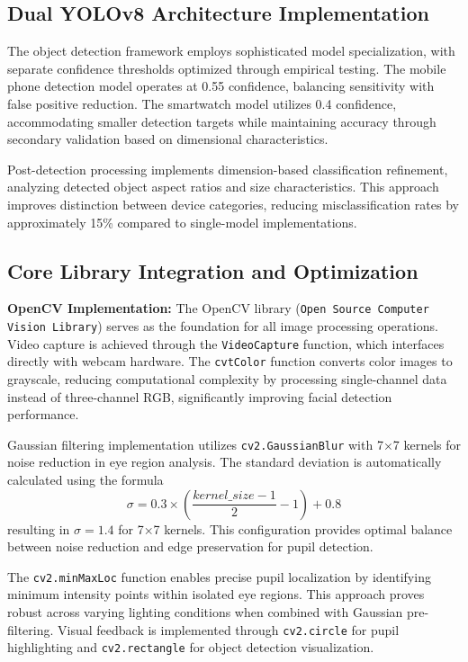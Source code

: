 \documentclass[conference]{IEEEtran}
\begin{document}
\subsection{Dual YOLOv8 Architecture Implementation}

The object detection framework employs sophisticated model specialization, with separate confidence thresholds optimized through empirical testing\cite{ultralytics}. The mobile phone detection model operates at 0.55 confidence, balancing sensitivity with false positive reduction. The smartwatch model utilizes 0.4 confidence, accommodating smaller detection targets while maintaining accuracy through secondary validation based on dimensional characteristics.

Post-detection processing implements dimension-based classification refinement, analyzing detected object aspect ratios and size characteristics. This approach improves distinction between device categories, reducing misclassification rates by approximately 15\% compared to single-model implementations\cite{redmon2018yolov3}.

\subsection{Core Library Integration and Optimization}

\textbf{OpenCV Implementation:} The OpenCV library (\texttt{Open Source Computer Vision Library}) serves as the foundation for all image processing operations\cite{hasan2021face}. Video capture is achieved through the \texttt{VideoCapture} function, which interfaces directly with webcam hardware. The \texttt{cvtColor} function converts color images to grayscale, reducing computational complexity by processing single-channel data instead of three-channel RGB, significantly improving facial detection performance.

Gaussian filtering implementation utilizes \texttt{cv2.GaussianBlur} with 7×7 kernels for noise reduction in eye region analysis. The standard deviation is automatically calculated using the formula 
\begin{equation}
\sigma = 0.3 \times \left(\frac{kernel\_size - 1}{2} - 1\right) + 0.8
\end{equation}resulting in $\sigma = 1.4$ for 7×7 kernels. This configuration provides optimal balance between noise reduction and edge preservation for pupil detection.

The \texttt{cv2.minMaxLoc} function enables precise pupil localization by identifying minimum intensity points within isolated eye regions. This approach proves robust across varying lighting conditions when combined with Gaussian pre-filtering. Visual feedback is implemented through \texttt{cv2.circle} for pupil highlighting and \texttt{cv2.rectangle} for object detection visualization.
\end{document}
